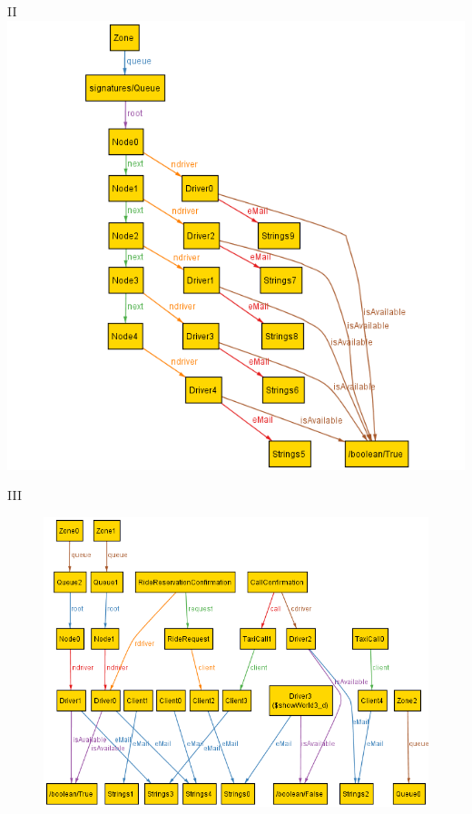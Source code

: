 \documentclass[9pt]{beamer}
\makeatletter
\newcommand*{\currentname}{\@currentlabelname}
\makeatother
\begin{document}
\begin{frame}{\currentname{} II}
\includegraphics[height=0.8\textheight]{Alloy-AllAvailable}
\centering
\label{fig:alloyworldallavailable}
\end{frame}

\begin{frame}{\currentname{} III}
\begin{figure}[H]
\includegraphics[height=0.8\textheight]{Alloy-FreeDriver}
\centering
\label{fig:alloyworldfreedriver}
\end{figure}
\end{frame}
\end{document}
